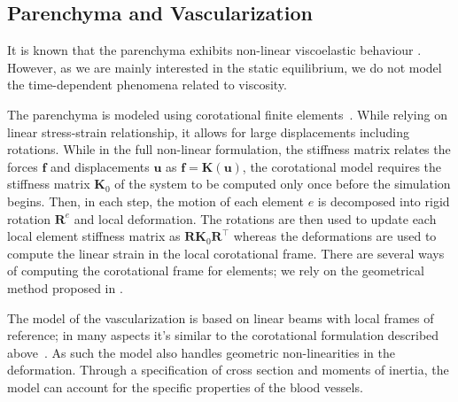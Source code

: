 \documentclass{llncs}
\renewcommand{\Vec}[1]{\mathbf{#1}}
\newcommand{\Mat}[1]{\mathbf{#1}}
\begin{document}
\subsection{Parenchyma and Vascularization} %

It is known that the parenchyma exhibits non-linear viscoelastic behaviour \cite{Marchesseau2010}.
However, as we are mainly interested in the static equilibrium, we do not model the time-dependent
phenomena related to viscosity.


The parenchyma is modeled using corotational finite elements~\cite{Felippa2005}.
While relying on linear stress-strain relationship, it allows for large displacements including rotations. 
While in the full non-linear formulation, the stiffness matrix relates the forces $\Vec{f}$ and 
displacements $\Vec{u}$ as $\Vec{f} = \Mat{K}(\Vec{u})$, the corotational model 
requires the stiffness matrix $\Mat{K}_0$ of the system to be computed only once before the simulation begins. 
Then, in each step, the motion of each element $e$ is decomposed into rigid rotation $\Mat{R}^e$ and local deformation. 
The rotations are then used to update each local element stiffness matrix as $\Mat{R}\Mat{K}_0\Mat{R}^{\top}$
whereas the deformations are used to compute the linear strain in the local corotational frame.
There are several ways of computing the corotational frame for elements; we rely on
the geometrical method proposed in \cite{Nesme2005}.

The model of the vascularization is based on linear beams 
with local frames of reference; in many aspects it's similar to the
corotational formulation described above~\cite{Duriez2006}. As such the model also handles geometric
non-linearities in the deformation. Through a specification of cross section and moments of inertia, 
the model can account for the specific properties of the blood vessels. 
\end{document}
